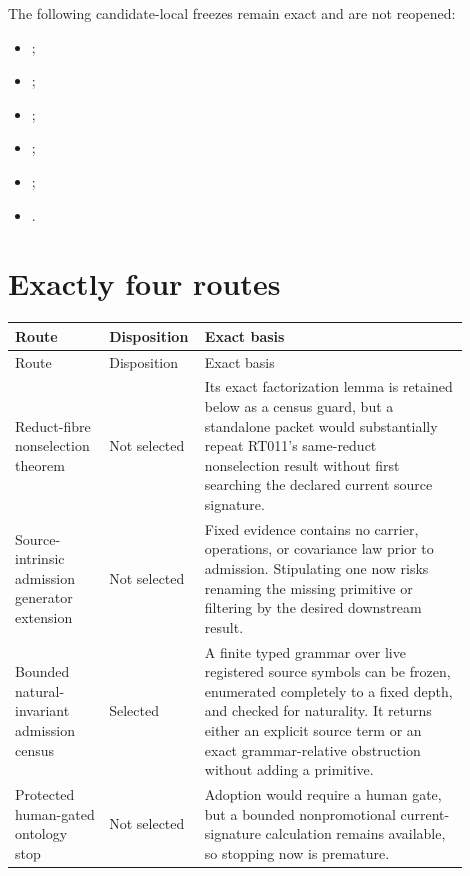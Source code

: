 \documentclass[11pt]{article}
\begin{document}
The following candidate-local freezes remain exact and are not reopened:
\begin{itemize}
  \item {};
  \item {};
  \item {};
  \item {};
  \item {};
  \item {}.
\end{itemize}

\section{Exactly four routes}

\begin{longtable}{P{0.20\linewidth}P{0.14\linewidth}P{0.56\linewidth}}
\toprule
Route & Disposition & Exact basis \\
\midrule
\endfirsthead
\toprule
Route & Disposition & Exact basis \\
\midrule
\endhead
Reduct-fibre nonselection theorem & Not selected & Its exact factorization
lemma is retained below as a census guard, but a standalone packet would
substantially repeat RT011's same-reduct nonselection result without first
searching the declared current source signature. \\
Source-intrinsic admission generator extension & Not selected & Fixed evidence
contains no carrier, operations, or covariance law prior to admission.
Stipulating one now risks renaming the missing primitive or filtering by the
desired downstream result. \\
Bounded natural-invariant admission census & Selected & A finite typed grammar
over live registered source symbols can be frozen, enumerated completely to a
fixed depth, and checked for naturality.  It returns either an explicit source
term or an exact grammar-relative obstruction without adding a primitive. \\
Protected human-gated ontology stop & Not selected & Adoption would require a
human gate, but a bounded nonpromotional current-signature calculation remains
available, so stopping now is premature. \\
\bottomrule
\end{longtable}
\end{document}
